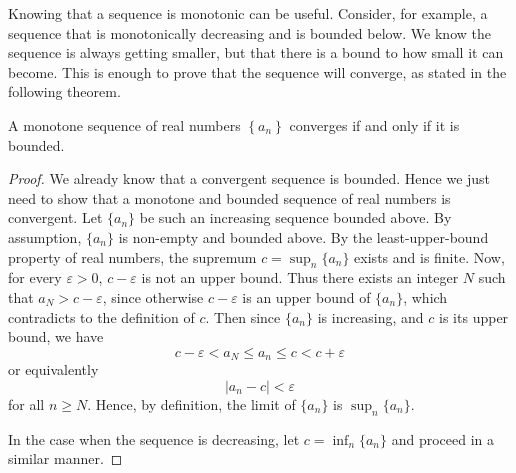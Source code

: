 Knowing that a sequence is monotonic can be useful. Consider, for example, a sequence that is monotonically decreasing and is bounded below. We know the sequence is always getting smaller, but that there is a bound to how small it can become. This is enough to prove that the sequence will converge, as stated in the following theorem.

\begin{theorem}\label{thm:monotonic_converge}
A monotone sequence of real numbers $\left\{a_n\right\}$ converges if and only if it is bounded.
\end{theorem}

\ifanalysis

	\checkoddpage
{}
\begin{proof}
We already know that a convergent sequence is bounded. Hence we just need to show that a monotone and bounded sequence of real numbers is convergent. Let $\{a_{n}\}$  be such an increasing sequence bounded above. By assumption, $\displaystyle \{a_{n}\}$ is non-empty and bounded above. By the least-upper-bound property of real numbers, the supremum $c=\sup _{n}\{a_{n}\}$ exists and is finite. Now, for every $\varepsilon >0$, $c-\varepsilon$ is not an upper bound. Thus there exists an integer $N$ such that $a_{N}>c-\varepsilon$, 
since otherwise $c-\varepsilon$ is an upper bound of $\{a_{n}\}$, which contradicts to the definition of $c$. Then since $\{a_{n}\}$ is increasing, and $c$ is its upper bound, we have 
$$c-\varepsilon<a_N\leq a_n\leq c<c+\varepsilon $$
or equivalently
$$
\left|a_n-c\right|<\varepsilon
$$
for all $n\geq N$.
Hence, by definition, the limit of $\{a_{n}\}$ is $ \sup _{n}\{a_{n}\}$. 

In the case when the sequence is decreasing, let $c=\inf _{n}\{a_{n}\}$ and proceed in a similar manner.
\end{proof}

